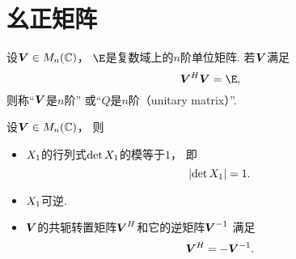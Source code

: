 \section{幺正矩阵}
\begin{definition}\label{definition:幺正矩阵.幺正矩阵的定义}
设\(\Q \in M_n(\mathbb{C})\)，
\(\E\)是复数域上的\(n\)阶单位矩阵.
若\(\Q\)满足\begin{equation}\label{equation:幺正矩阵.幺正矩阵的定义式}
	\Q^H \Q = \E,
\end{equation}
则称“\(\Q\)是\(n\)阶”
或“\(Q\)是\(n\)阶（unitary matrix）”.
\end{definition}

\begin{property}
设\(\Q \in M_n(\mathbb{C})\)，
则\begin{itemize}
	\item \(X_1\)的行列式\(\det X_1\)的模等于\(1\)，
	即\begin{equation}\label{equation:幺正矩阵.幺正矩阵的行列式}
		\abs{\det X_1}=1.
	\end{equation}

	\item \(X_1\)可逆.

	\item \(\Q\)的共轭转置矩阵\(\Q^H\)和它的逆矩阵\(\Q^{-1}\)
	满足\begin{equation}\label{equation:幺正矩阵.幺正矩阵的转置等于幺正矩阵的逆}
		\Q^H = -\Q^{-1}.
	\end{equation}
\end{itemize}
\end{property}

